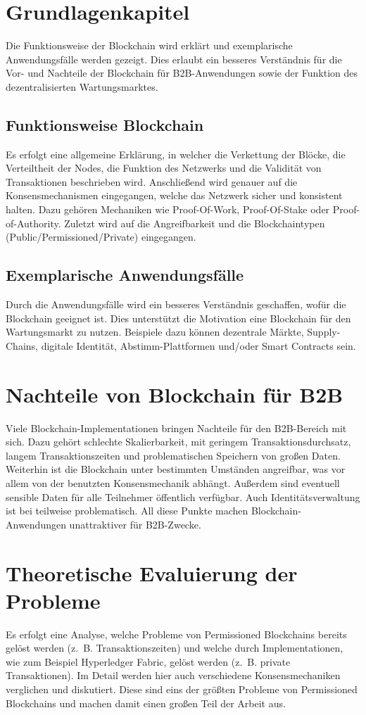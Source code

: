 \documentclass{llncs}
\begin{document}
\section{Grundlagenkapitel}
Die Funktionsweise der Blockchain wird erklärt und exemplarische Anwendungsfälle werden gezeigt. Dies erlaubt ein besseres Verständnis für die Vor- und Nachteile der Blockchain für B2B-Anwendungen sowie der Funktion des dezentralisierten Wartungsmarktes.

\subsection{Funktionsweise Blockchain}
Es erfolgt eine allgemeine Erklärung, in welcher die Verkettung der Blöcke, die Verteiltheit der Nodes, die Funktion des Netzwerks und die Validität von Transaktionen beschrieben wird. Anschließend wird genauer auf die Konsensmechanismen eingegangen, welche das Netzwerk sicher und konsistent halten. Dazu gehören Mechaniken wie Proof-Of-Work, Proof-Of-Stake oder Proof-of-Authority. Zuletzt wird auf die Angreifbarkeit und die Blockchaintypen (Public/Permissioned/Private) eingegangen.

\subsection{Exemplarische Anwendungsfälle}
Durch die Anwendungsfälle wird ein besseres Verständnis geschaffen, wofür die Blockchain geeignet ist. Dies unterstützt die Motivation eine Blockchain für den Wartungsmarkt zu nutzen. Beispiele dazu können dezentrale Märkte, Supply-Chains, digitale Identität, Abstimm-Plattformen und/oder Smart Contracts sein.

\section{Nachteile von Blockchain für B2B}
Viele Blockchain-Implementationen bringen Nachteile für den B2B-Bereich mit sich. Dazu gehört schlechte Skalierbarkeit, mit geringem Transaktionsdurchsatz, langem Transaktionszeiten und problematischen Speichern von großen Daten. Weiterhin ist die Blockchain unter bestimmten Umständen angreifbar, was vor allem von der benutzten Konsensmechanik abhängt. Außerdem sind eventuell sensible Daten für alle Teilnehmer öffentlich verfügbar. Auch Identitätsverwaltung ist bei teilweise problematisch. All diese Punkte machen Blockchain-Anwendungen unattraktiver für B2B-Zwecke.

\section{Theoretische Evaluierung der Probleme}
Es erfolgt eine Analyse, welche Probleme von Permissioned Blockchains bereits gelöst werden (z.~B. Transaktionszeiten) und welche durch Implementationen, wie zum Beispiel Hyperledger Fabric, gelöst werden (z.~B. private Transaktionen). Im Detail werden hier auch verschiedene Konsensmechaniken verglichen und diskutiert. Diese sind eins der größten Probleme von Permissioned Blockchains und machen damit einen großen Teil der Arbeit aus.
\end{document}
